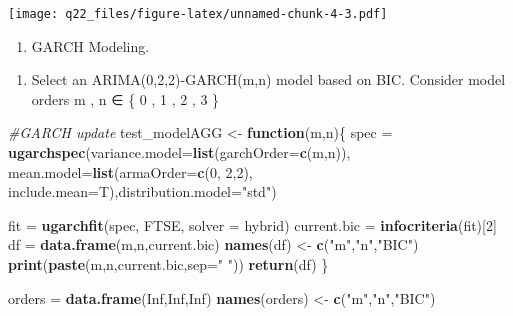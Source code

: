 \documentclass[
]{article}
\newenvironment{Shaded}{\begin{snugshade}}{\end{snugshade}}
\newcommand{\CommentTok}[1]{\textcolor[rgb]{0.56,0.35,0.01}{\textit{#1}}}
\newcommand{\ControlFlowTok}[1]{\textcolor[rgb]{0.13,0.29,0.53}{\textbf{#1}}}
\newcommand{\DataTypeTok}[1]{\textcolor[rgb]{0.13,0.29,0.53}{#1}}
\newcommand{\DecValTok}[1]{\textcolor[rgb]{0.00,0.00,0.81}{#1}}
\newcommand{\KeywordTok}[1]{\textcolor[rgb]{0.13,0.29,0.53}{\textbf{#1}}}
\newcommand{\NormalTok}[1]{#1}
\newcommand{\OtherTok}[1]{\textcolor[rgb]{0.56,0.35,0.01}{#1}}
\newcommand{\StringTok}[1]{\textcolor[rgb]{0.31,0.60,0.02}{#1}}
\providecommand{\tightlist}{%
  \setlength{\itemsep}{0pt}\setlength{\parskip}{0pt}}
\begin{document}
\texttt{[image: q22\_files/figure-latex/unnamed-chunk-4-3.pdf]}

\begin{enumerate}
\def\labelenumi{\arabic{enumi}.}
\setcounter{enumi}{1}
\tightlist
\item
  GARCH Modeling.
\end{enumerate}

\begin{enumerate}
\def\labelenumi{(\alph{enumi})}
\tightlist
\item
  Select an ARIMA(0,2,2)-GARCH(m,n) model based on BIC. Consider model
  orders m , n ∈ \{ 0 , 1 , 2 , 3 \}
\end{enumerate}

\begin{Shaded}
\begin{Highlighting}[]
\CommentTok{\#GARCH update}
\NormalTok{test\_modelAGG \textless{}{-}}\StringTok{ }\ControlFlowTok{function}\NormalTok{(m,n)\{}
\NormalTok{  spec =}\StringTok{ }\KeywordTok{ugarchspec}\NormalTok{(}\DataTypeTok{variance.model=}\KeywordTok{list}\NormalTok{(}\DataTypeTok{garchOrder=}\KeywordTok{c}\NormalTok{(m,n)),}
                    \DataTypeTok{mean.model=}\KeywordTok{list}\NormalTok{(}\DataTypeTok{armaOrder=}\KeywordTok{c}\NormalTok{(}\DecValTok{0}\NormalTok{, }\DecValTok{2}\NormalTok{,}\DecValTok{2}\NormalTok{), }
                    \DataTypeTok{include.mean=}\NormalTok{T),}\DataTypeTok{distribution.model=}\StringTok{"std"}\NormalTok{) }

\NormalTok{  fit =}\StringTok{ }\KeywordTok{ugarchfit}\NormalTok{(spec, FTSE, }\DataTypeTok{solver =} \StringTok{\textquotesingle{}hybrid\textquotesingle{}}\NormalTok{)}
\NormalTok{  current.bic =}\StringTok{ }\KeywordTok{infocriteria}\NormalTok{(fit)[}\DecValTok{2}\NormalTok{]}
\NormalTok{  df =}\StringTok{ }\KeywordTok{data.frame}\NormalTok{(m,n,current.bic)}
  \KeywordTok{names}\NormalTok{(df) \textless{}{-}}\StringTok{ }\KeywordTok{c}\NormalTok{(}\StringTok{"m"}\NormalTok{,}\StringTok{"n"}\NormalTok{,}\StringTok{"BIC"}\NormalTok{)}
  \KeywordTok{print}\NormalTok{(}\KeywordTok{paste}\NormalTok{(m,n,current.bic,}\DataTypeTok{sep=}\StringTok{" "}\NormalTok{))}
  \KeywordTok{return}\NormalTok{(df)}
\NormalTok{\}}

\NormalTok{orders =}\StringTok{ }\KeywordTok{data.frame}\NormalTok{(}\OtherTok{Inf}\NormalTok{,}\OtherTok{Inf}\NormalTok{,}\OtherTok{Inf}\NormalTok{)}
\KeywordTok{names}\NormalTok{(orders) \textless{}{-}}\StringTok{ }\KeywordTok{c}\NormalTok{(}\StringTok{"m"}\NormalTok{,}\StringTok{"n"}\NormalTok{,}\StringTok{"BIC"}\NormalTok{)}


\end{Highlighting}
\end{Shaded}
\end{document}
